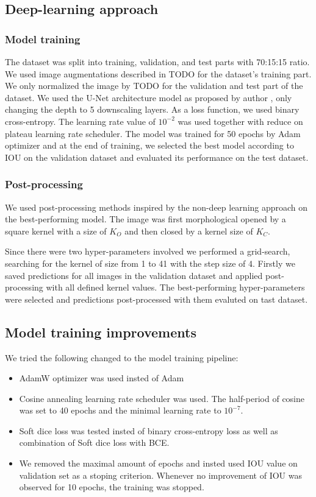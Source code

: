 \subsection{Deep-learning approach}
\subsubsection{Model training}
The dataset was split into training, validation, and test parts with 70:15:15 ratio. We used image augmentations described in TODO for the dataset's training part. We only normalized the image by TODO for the validation and test part of the dataset.
We used the U-Net architecture model as proposed by author \cite{Ronneberger2015}, only changing the depth to 5 downscaling layers. As a loss function, we used binary cross-entropy. The learning rate value of $10^{-2}$ was used together with reduce on plateau learning rate scheduler. The model was trained for 50 epochs by Adam optimizer and at the end of training, we selected the best model according to IOU on the validation dataset and evaluated its performance on the test dataset.

\subsubsection{Post-processing}
We used post-processing methods inspired by the non-deep learning approach on the best-performing model. The image was first morphological opened by a square kernel with a size of $K_O$ and then closed by a kernel size of $K_C$.

Since there were two hyper-parameters involved we performed a grid-search, searching for the kernel of size from 1 to 41 with the step size of 4. Firstly we saved predictions for all images in the validation dataset and applied post-processing with all defined kernel values. The best-performing hyper-parameters were selected and predictions post-processed with them evaluted on tast dataset.

\subsection{Model training improvements}
We tried the following changed to the model training pipeline:
\begin{itemize}
    \item AdamW optimizer was used insted of Adam
    \item Cosine annealing learning rate scheduler was used. The half-period of cosine was set to 40 epochs and the minimal learning rate to $10^{-7}$.
    \item Soft dice loss was tested insted of binary cross-entropy loss as well as combination of Soft dice loss with BCE.
    \item We removed the maximal amount of epochs and insted used IOU value on validation set as a stoping criterion. Whenever no improvement of IOU was observed for 10 epochs, the training was stopped.
\end{itemize}

